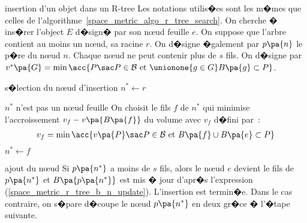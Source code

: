         \begin{xalgorithm}{insertion d'un objet dans un R-tree} \label{space_metric_algo_r_tree_insert}
        Les notations utilis�es sont les m�mes que celles de l'algorithme~\ref{space_metric_algo_r_tree_search}.
        On cherche � ins�rer l'object $E$ d�sign� par son n\oe ud feuille $e$. On suppose que l'arbre contient au
        moins un n\oe ud, sa racine $r$. On d�signe �galement par $p\pa{n}$ le p�re du n\oe ud $n$. Chaque n\oe ud 
        ne peut contenir plus de $s$ fils. On d�signe par  
        $v^*\pa{G} = \min \acc{ P \sac P \in \mathcal{B} \text{ et } 
                \unionone{g \in G} B\pa{g}  \subset P }$.
        
        \begin{xalgostep}{s�lection du n\oe ud d'insertion}
        $n^* \longleftarrow r$ \\
        \begin{xwhile}{$n^*$ n'est pas un n\oe ud feuille}
            On choisit le fils $f$ de $n^*$ qui minimise l'accroissement $v_f - v\pa{B\pa{f}}$ 
            du volume avec $v_f$ d�fini par~: 
                \begin{eqnarray}
                v_f = \min \acc{ v\pa{P} \sac P \in \mathcal{B} \text{ et } B\pa{f} \cup B\pa{e}  \subset P }  
                \label{space_metric_r_tree_b_n_update}
                \end{eqnarray}
                $n^* \longleftarrow f$
        \end{xwhile}
        \end{xalgostep}
        
        \begin{xalgostep}{ajout du n\oe ud}
        Si $p\pa{n^*}$ a moins de $s$ fils, alors le n\oe ud $e$ devient le fils de $p\pa{n^*}$ et $B\pa{p\pa{n^*}}$ est 
        mis � jour d'apr�s l'expression (\ref{space_metric_r_tree_b_n_update}). L'insertion est termin�e.
        Dans le cas contraire, on s�pare d�coupe le n\oe ud $p\pa{n^*}$ en deux gr�ce � l'�tape suivante.
        \end{xalgostep}
        


\end{xalgorithm}
